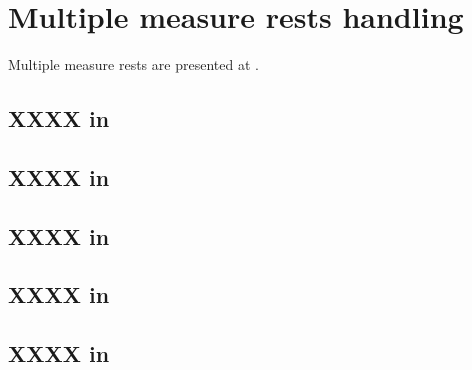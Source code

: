 



\chapter{Multiple measure rests handling}\label{Multiple measure rests handling}

Multiple measure rests are presented at .


\section{XXXX in \mxsrToMsr{}}


\section{XXXX in \mxsrToMsr{}}


\section{XXXX in \msrToMsr{}}


\section{XXXX in \msrToLpsr{}}


\section{XXXX in \lpsrToLilypond{}}


